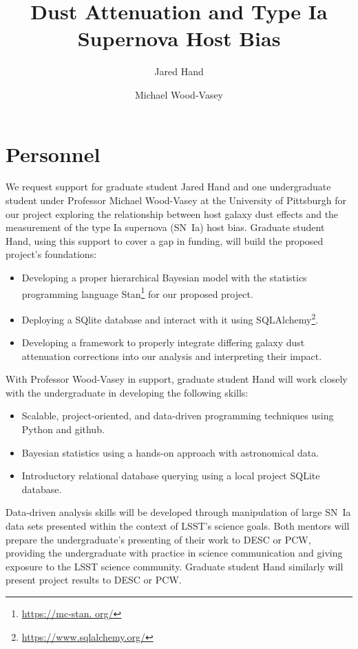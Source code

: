 \documentclass[modern]{aastex63}
\begin{document}
\title{Dust Attenuation and Type Ia Supernova Host Bias}

\author{Jared Hand}
\author{Michael Wood-Vasey}
\section{Personnel}
We request support for graduate student Jared Hand and one undergraduate student under Professor Michael Wood-Vasey at the University of Pittsburgh for our project exploring the relationship between host galaxy dust effects and the measurement of the type Ia supernova (SN~Ia) host bias.
Graduate student Hand, using this support to cover a gap in funding, will build the proposed project's foundations:
\begin{itemize}
    \item Developing a proper hierarchical Bayesian model with the statistics programming language Stan\footnote{\url{https://mc-stan.
    org/}} for our proposed project.
    \item Deploying a SQlite database and interact with it using SQLAlchemy\footnote{\url{https://www.sqlalchemy.org/}}.
    \item Developing a framework to properly integrate differing galaxy dust attenuation corrections into our analysis and interpreting their impact.
\end{itemize}
With Professor Wood-Vasey in support, graduate student Hand will work closely with the undergraduate in developing the following skills:
\begin{itemize}
    \item Scalable, project-oriented, and data-driven programming techniques using Python and github.
    \item Bayesian statistics using a hands-on approach with astronomical data. 
    \item Introductory relational database querying using a local project SQLite database.
\end{itemize}
Data-driven analysis skills will be developed through manipulation of large SN~Ia data sets presented within the context of LSST's science goals.
Both mentors will prepare the undergraduate's presenting of their work to DESC or PCW, providing the undergraduate with practice in science communication and giving exposure to the LSST science community.
Graduate student Hand similarly will present project results to DESC or PCW.
\end{document}
